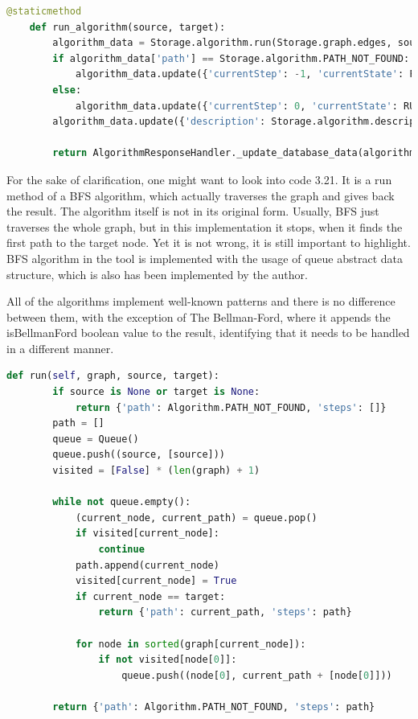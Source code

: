 \begin{lstlisting}[language={python}]
 	@staticmethod
	def run_algorithm(source, target):
		algorithm_data = Storage.algorithm.run(Storage.graph.edges, source, target)
		if algorithm_data['path'] == Storage.algorithm.PATH_NOT_FOUND:
			algorithm_data.update({'currentStep': -1, 'currentState': FINISHED_STATE})
		else:
			algorithm_data.update({'currentStep': 0, 'currentState': RUNNING_STATE})
		algorithm_data.update({'description': Storage.algorithm.description()})
		
		return AlgorithmResponseHandler._update_database_data(algorithm_data)
\end{lstlisting}

For the sake of clarification, one might want to look into code 3.21. It is a run method of a BFS algorithm, which actually traverses the graph and gives back the result. The algorithm itself is not in its original form. Usually, BFS just traverses the whole graph, but in this implementation it stops, when it finds the first path to the target node. Yet it is not wrong, it is still important to highlight. BFS algorithm in the tool is implemented with the usage of queue abstract data structure, which is also has been implemented by the author. 

All of the algorithms implement well-known patterns and there is no difference between them, with the exception of The Bellman-Ford, where it appends the isBellmanFord boolean value to the result, identifying that it needs to be handled in a different manner.

\begin{lstlisting}[language={python}]
    def run(self, graph, source, target):
		if source is None or target is None:
			return {'path': Algorithm.PATH_NOT_FOUND, 'steps': []}
		path = []
		queue = Queue()
		queue.push((source, [source]))
		visited = [False] * (len(graph) + 1)
		
		while not queue.empty():
			(current_node, current_path) = queue.pop()
			if visited[current_node]:
				continue
			path.append(current_node)
			visited[current_node] = True
			if current_node == target:
				return {'path': current_path, 'steps': path}
			
			for node in sorted(graph[current_node]):
				if not visited[node[0]]:
					queue.push((node[0], current_path + [node[0]]))
		
		return {'path': Algorithm.PATH_NOT_FOUND, 'steps': path}
\end{lstlisting}

